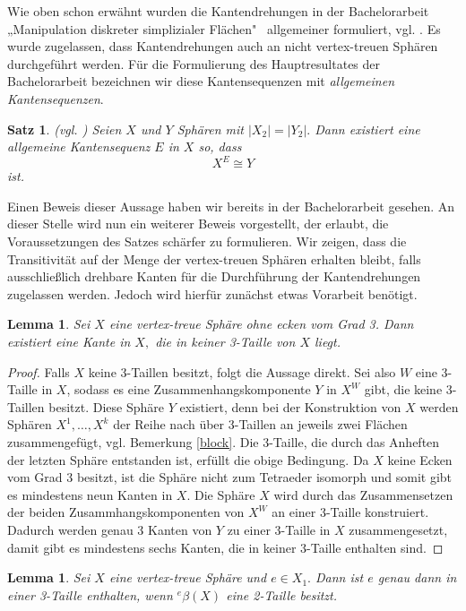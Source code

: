 \documentclass[12pt,titlepage,twoside,cleardoublepage]{article}
\theoremstyle{nummermitklammern}
\newtheorem{lemma}[temp]{Lemma}
\newtheorem{satz}[temp]{Satz}
\newtheorem{lemma}[zahl]{Lemma}
\newtheorem{satz}[zahl]{Satz}
\numberwithin{equation}{section}
\begin{document}
Wie oben schon erwähnt wurden die Kantendrehungen in der Bachelorarbeit „Manipulation diskreter simplizialer Flächen"  \, 
 allgemeiner formuliert, vgl. \cite{Rey}. Es wurde zugelassen, dass Kantendrehungen auch an nicht vertex-treuen Sphären durchgeführt werden. Für die Formulierung des Hauptresultates der Bachelorarbeit bezeichnen wir diese Kantensequenzen mit \emph{allgemeinen Kantensequenzen}.
\begin{satz}{(vgl. \textsc{\cite{Rey})}}
Seien $X$ und $Y$ Sphären mit $\vert X_2\vert=\vert Y_2\vert.$ Dann existiert eine allgemeine Kantensequenz $E$ in $X$ so, dass 
\[
X^E \cong Y
\]
ist. 
\end{satz}
Einen Beweis dieser Aussage haben wir bereits in der Bachelorarbeit \cite{Rey} gesehen. An dieser Stelle wird nun ein weiterer Beweis vorgestellt, der erlaubt, die Voraussetzungen des Satzes schärfer zu formulieren. Wir zeigen, dass die Transitivität auf der Menge der vertex-treuen Sphären erhalten bleibt, falls ausschließlich drehbare Kanten für die Durchführung der Kantendrehungen zugelassen werden. Jedoch wird hierfür zunächst etwas Vorarbeit benötigt.\\ 
 \begin{lemma}\label{a}
 Sei $X$ eine vertex-treue Sphäre ohne ecken vom Grad 3. Dann existiert eine Kante in $X,$ die in keiner 3-Taille von $X$ liegt. 
 \end{lemma}
 \begin{proof}
 Falls $X$ keine 3-Taillen besitzt, folgt die Aussage direkt.
Sei also $W$ eine 3-Taille in $X$, sodass es eine Zusammenhangskomponente $Y$ in $X^W$ gibt, die keine 3-Taillen besitzt. Diese Sphäre $Y$ existiert, denn bei der Konstruktion von $X$ werden Sphären $X^1,\ldots,X^k$ der Reihe nach über 3-Taillen an jeweils zwei Flächen zusammengefügt, vgl. Bemerkung \ref{block}. Die 3-Taille, die durch das Anheften der letzten Sphäre entstanden ist, erfüllt die obige Bedingung.  Da $X$ keine Ecken vom Grad 3 besitzt, ist die Sphäre nicht zum Tetraeder isomorph und somit gibt es mindestens neun Kanten in $X$. Die Sphäre $X$ wird durch das Zusammensetzen der beiden Zusammhangskomponenten von $X^W$ an einer 3-Taille konstruiert. Dadurch werden genau 3 Kanten von $Y$ zu einer 3-Taille in $X$ zusammengesetzt, damit gibt es mindestens sechs Kanten, die in keiner 3-Taille enthalten sind.
 \end{proof}
 \begin{lemma}\label{b}
 Sei $X$ eine vertex-treue Sphäre und $e\in X_1.$ Dann ist $e$ genau dann in einer 3-Taille enthalten, wenn ${}^e\beta(X)$ eine 2-Taille besitzt.
 \end{lemma}
\end{document}
